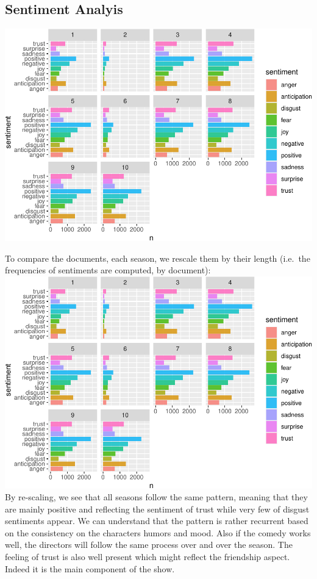 \documentclass[
]{article}
\begin{document}
\hypertarget{sentiment-analyis}{%
\subsection{Sentiment Analyis}\label{sentiment-analyis}}

\includegraphics{report_files/figure-latex/unnamed-chunk-35-1.pdf}

To compare the documents, each season, we rescale them by their length
(i.e.~the frequencies of sentiments are computed, by document):
\includegraphics{report_files/figure-latex/unnamed-chunk-36-1.pdf} By
re-scaling, we see that all seasons follow the same pattern, meaning
that they are mainly positive and reflecting the sentiment of trust
while very few of disgust sentiments appear. We can understand that the
pattern is rather recurrent based on the consistency on the characters
humors and mood. Also if the comedy works well, the directors will
follow the same process over and over the season. The feeling of trust
is also well present which might reflect the friendship aspect. Indeed
it is the main component of the show.
\end{document}
